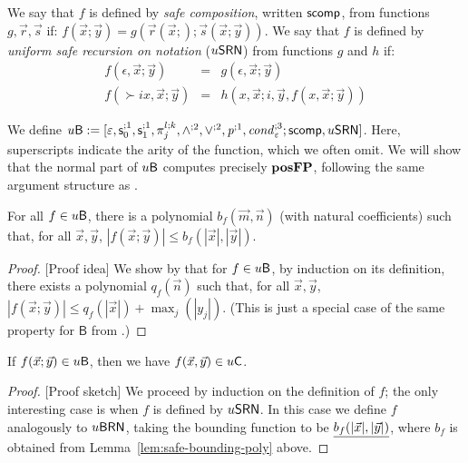 \documentclass{lmcs}
\begin{document}
\begin{definition} 
	We say that $f$ is defined by \emph{safe composition}, written $\mathsf{scomp}$, from functions $g,\vec r,\vec s$ if: 
	$
	f (\vec x; \vec y ) = g(\vec r(\vec x;);\vec s(\vec x;\vec y))
	$.
	We say that $f$ is defined by \emph{uniform safe recursion on notation} ($u\mathsf{SRN}$) from functions $g$ and $h$ if: 
	\[
	\begin{array}{rcl}
	f (\epsilon ,\vec x; \vec y ) & = & g(\epsilon ,\vec x;\vec y)\\
	f (\succ i x,\vec x; \vec y ) & = & h( x,\vec x ; i, \vec y , f(x,\vec x;\vec y))
	\end{array}
	\]
\end{definition}

We define $u \mathsf{B} := [\varepsilon, \mathsf s_{0}^{;1}, \mathsf s_{1}^{;1}, \pi^{l;k}_j , \wedge^{;2} , \vee^{;2}, \mathit{p}^{;1} , \mathit{cond}^{;3}_{\varepsilon} ; \mathsf{scomp} , u\mathsf{SRN}]$. Here, superscripts indicate the arity of the function, which we often omit.
%
We will show that the normal part of $u \mathsf{B}$ computes precisely $\mathbf{pos}\mathbf{FP}$, following the same argument structure as \cite{BelCoo92}.

\begin{lemma}
	\label{lem:safe-bounding-poly}
	For all $f\in u \mathsf{B}$, there is a polynomial $b_f (\vec m , \vec n)$ (with natural coefficients)  such that, for all $\vec x , \vec y$, $  |f(\vec x;\vec y)|\leq b_f (|\vec x|, |\vec y|).$
\end{lemma}

\begin{proof}
	[Proof idea]
	We show by that for $f\in u \mathsf{B}$, by induction on its definition, there exists a polynomial $q_f(\vec n)$ such that, for all $\vec x , \vec y$, $ |f(\vec x;\vec y)|\leq q_f (|\vec x|) + \max_j (| y_j|)$.
	(This is just a special case of the same property for $\mathsf B$ from \cite{BelCoo92}.)
\end{proof}


\begin{proposition}
	\label{prop:unicob-contains-unibc}
	If $f(\vec x ; \vec y) \in u \mathsf{B}$, then we have $f(\vec x , \vec y) \in u \mathsf{C}$.
\end{proposition}

\begin{proof}
	[Proof sketch]
	We proceed by induction on the definition of $f$; the only interesting case is when $f$ is defined by $u\mathsf{SRN}$. In this case we define $f$ analogously to $u\mathsf{BRN}$, taking the bounding function to be $\underline{b_f (|\vec x|, |\vec y|) }$,
	 where $b_f$ is obtained from Lemma~\ref{lem:safe-bounding-poly} above.
\end{proof}
\end{document}
